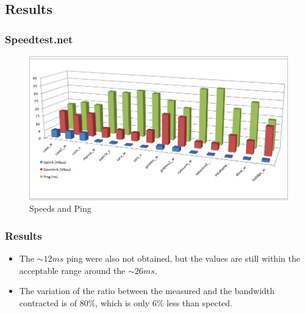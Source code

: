 \subsection{Results}
\begin{frame}
	\frametitle{Speedtest.net}
	\begin{figure}[h!]
		\centering
		\includegraphics[scale=.45]{img/speed_graph}
		\caption{Speeds and Ping}
	\end{figure}
\end{frame}
\begin{frame}
	\frametitle{Results}
	\begin{block}{}
		\begin{itemize}
			\item The $\sim12ms$ ping were also not obtained, but the values are still within the acceptable range around the $\sim26ms$.
			\item The variation of the ratio between the measured and the bandwidth contracted is of 80\%, which is only 6\% less than spected.
		\end{itemize}
	\end{block}
\end{frame}


